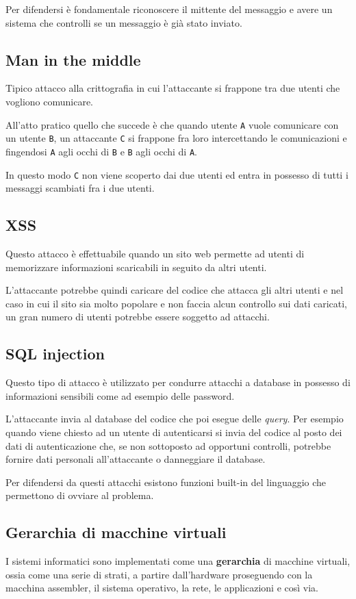 Per difendersi è fondamentale riconoscere il mittente del messaggio e avere un sistema che controlli se un messaggio è
già stato inviato.

\subsection{Man in the middle}
Tipico attacco alla crittografia in cui l'attaccante si frappone tra due utenti che vogliono comunicare.

All'atto pratico quello che succede è che quando utente \verb|A| vuole comunicare con un utente \verb|B|, un attaccante
\verb|C| si frappone fra loro intercettando le comunicazioni e fingendosi \verb|A| agli occhi di \verb|B| e \verb|B|
agli occhi di \verb|A|.

In questo modo \verb|C| non viene scoperto dai due utenti ed entra in possesso di tutti i messaggi scambiati fra i due
utenti.

\subsection{XSS}
Questo attacco è effettuabile quando un sito web permette ad utenti di memorizzare informazioni scaricabili in seguito
da altri utenti.

L'attaccante potrebbe quindi caricare del codice che attacca gli altri utenti e nel caso in cui il sito sia molto
popolare e non faccia alcun controllo sui dati caricati, un gran numero di utenti potrebbe essere soggetto ad attacchi.

\subsection{SQL injection}
Questo tipo di attacco è utilizzato per condurre attacchi a database in possesso di informazioni sensibili come ad
esempio delle password.

L'attaccante invia al database del codice che poi esegue delle \emph{query}. Per esempio quando viene chiesto ad un
utente di autenticarsi si invia del codice al posto dei dati di autenticazione che, se non sottoposto ad opportuni
controlli, potrebbe fornire dati personali all'attaccante o danneggiare il database.

Per difendersi da questi attacchi esistono funzioni built-in del linguaggio che permettono di ovviare al problema.

\subsection{Gerarchia di macchine virtuali}
I sistemi informatici sono implementati come una \textbf{gerarchia} di macchine virtuali, ossia come una serie di
strati, a partire dall'hardware proseguendo con la macchina assembler, il sistema operativo, la rete, le applicazioni
e così via.

